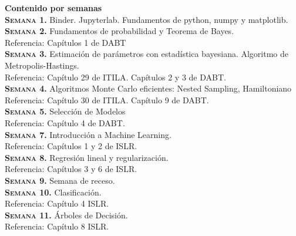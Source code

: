 \documentclass[letterpaper,10pt,onecolumn]{article}
\begin{document}
\noindent\textbf{\large {} \quad Contenido por
  semanas}\\[-0.2cm] 


\noindent\textbf{\textsc{Semana 1.}}
Binder. Jupyterlab. Fundamentos de python, numpy y matplotlib.
\\[-0.3cm]

\noindent\textbf{\textsc{Semana 2.}}
Fundamentos de probabilidad y Teorema de Bayes.\\
Referencia: Cap\'itulos 1 de DABT
\\[-0.3cm]

\noindent\textbf{\textsc{Semana 3.}} 
Estimaci\'on de par\'ametros con estad\'istica bayesiana. Algoritmo de Metropolis-Hastings.\\
Referencia: Cap\'itulo 29 de ITILA. Cap\'itulos 2 y 3 de DABT.  
\\[-0.3cm]  

\noindent\textbf{\textsc{Semana 4.}}
Algoritmos Monte Carlo eficientes: Nested Sampling, Hamiltoniano\\
Referencia: Cap\'itulo 30 de ITILA. Cap\'itulo 9 de DABT.
\\[-0.3cm] 

\noindent\textbf{\textsc{Semana 5.}} 
Selecci\'on de Modelos\\
Referencia: Cap\'itulo 4 de DABT.
\\[-0.3cm] 

\noindent\textbf{\textsc{Semana 7.}}  
Introducci\'on a Machine Learning. \\
Referencia: Cap\'itulos 1 y 2 de ISLR.
\\[-0.3cm] 

\noindent\textbf{\textsc{Semana 8.}}  
Regresi\'on lineal y regularizaci\'on.\\
Referencia: Cap\'itulos 3 y 6 de ISLR.
\\[-0.3cm]

\noindent\textbf{\textsc{Semana 9.}}
Semana de receso.
\\[-0.3cm] 

\noindent\textbf{\textsc{Semana 10.}} 
Clasificaci\'on.\\
Referencia: Cap\'itulo 4 ISLR. 
\\[-0.3cm]  

\noindent\textbf{\textsc{Semana 11.}} 
\'Arboles de Decisi\'on.\\
Referencia: Cap\'itulo 8 ISLR. 
\\[-0.3cm]  
\end{document}
